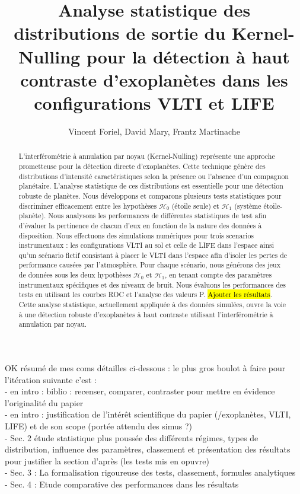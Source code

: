 \documentclass{article}
\title{Analyse statistique des distributions de sortie du Kernel-Nulling pour la détection à haut contraste d'exoplanètes dans les configurations VLTI et LIFE}
\author{Vincent Foriel,
        David Mary,
        Frantz Martinache
       }
\newcommand{\dm}[1]{{\color{mulberry} #1}}
\begin{document}
\maketitle

\begin{abstract}
L'interférométrie à annulation par noyau (Kernel-Nulling) représente une approche prometteuse pour la détection directe d'exoplanètes. Cette technique génère des distributions d'intensité caractéristiques selon la présence ou l'absence d'un compagnon planétaire. L'analyse statistique de ces distributions est essentielle pour une détection robuste de planètes. Nous développons et comparons plusieurs tests statistiques pour discriminer efficacement entre les hypothèses $\mathcal{H}_0$ (étoile seule) et $\mathcal{H}_1$ (système étoile-planète). Nous analysons les performances de différentes statistiques de test afin d'évaluer la pertinence de chacun d'eux en fonction de la nature des données à disposition. Nous effectuons des simulations numériques pour trois scenarios instrumentaux : les configurations VLTI au sol et celle de LIFE dans l'espace ainsi qu'un scénario fictif consistant à placer le VLTI dans l'espace afin d'isoler les pertes de performance causées par l'atmosphère. Pour chaque scénario, nous générons des jeux de données sous les deux hypothèses $\mathcal{H}_0$ et $\mathcal{H}_1$, en tenant compte des paramètres instrumentaux spécifiques et des niveaux de bruit. Nous évaluons les performances des tests en utilisant les courbes ROC et l'analyse des valeurs P. \hl{Ajouter les résultats}. Cette analyse statistique, actuellement appliquée à des données simulées, ouvre la voie à une détection robuste d'exoplanètes à haut contraste utilisant l'interférométrie à annulation par noyau.
\end{abstract}

\dm{OK résumé de mes coms détailles ci-dessous : le plus gros boulot à faire pour l'itération suivante c'est : \\
- en intro : biblio : recenser, comparer, contraster pour mettre en évidence l'originalité du papier\\
- en intro : justification de l'intérêt scientifique du papier (/exoplanètes, VLTI, LIFE) et de son scope (portée attendu des simus ?) \\
- Sec. 2 étude statistique plus poussée des différents régimes, types de distribution, influence des paramètres, classement et présentation des résultats pour justifier la section d'après (les tests mis en opuvre)\\
- Sec. 3 : La formalisation rigoureuse des tests, classement, formules analytiques \\
- Sec. 4 : Etude comparative des performances dans les résultats }
\end{document}
